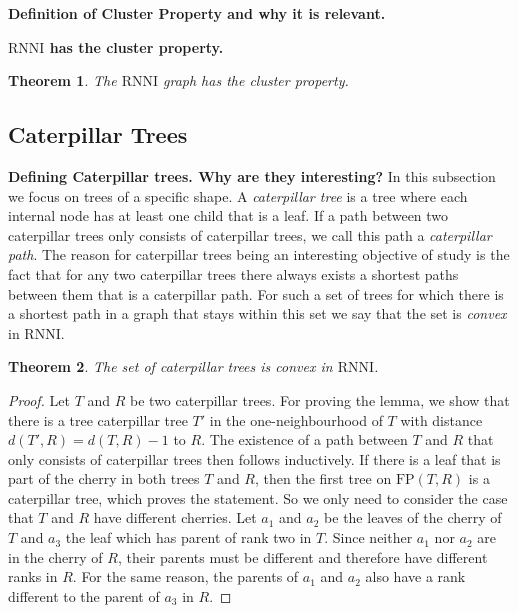 \documentclass[11pt]{amsart}
\newtheorem{theorem}{Theorem}
\newcommand{\rnni}{\mathrm{RNNI}}
\newcommand{\fp}{\mathrm{FP}}
\newcommand{\summary}[1]{\textbf{#1}} %
\begin{document}
\summary{Definition of Cluster Property and why it is relevant.}

\summary{$\rnni$ has the cluster property.}
\begin{theorem}
	The $\rnni$ graph has the cluster property.
\end{theorem}

\subsection{Caterpillar Trees}

\summary{Defining Caterpillar trees. Why are they interesting?}
In this subsection we focus on trees of a specific shape.
A \emph{caterpillar tree} is a tree where each internal node has at least one child that is a leaf.
If a path between two caterpillar trees only consists of caterpillar trees, we call this path a \emph{caterpillar path}.
The reason for caterpillar trees being an interesting objective of study is the fact that for any two caterpillar trees there always exists a shortest paths between them that is a caterpillar path.
For such a set of trees for which there is a shortest path in a graph that stays within this set we say that the set is \emph{convex} in $\rnni$.

\begin{theorem}
	The set of caterpillar trees is convex in $\rnni$.
	\label{thm:caterpillar_convex_rnni}
\end{theorem}

\begin{proof}
	Let $T$ and $R$ be two caterpillar trees.
	For proving the lemma, we show that there is a tree caterpillar tree $T'$ in the one-neighbourhood of $T$ with distance $d(T',R) = d(T,R) - 1$ to $R$.
	The existence of a path between $T$ and $R$ that only consists of caterpillar trees then follows inductively.
	If there is a leaf that is part of the cherry in both trees $T$ and $R$, then the first tree on $\fp(T,R)$ is a caterpillar tree, which proves the statement.
	So we only need to consider the case that $T$ and $R$ have different cherries.
	Let $a_1$ and $a_2$ be the leaves of the cherry of $T$ and $a_3$ the leaf which has parent of rank two in $T$.
	Since neither $a_1$ nor $a_2$ are in the cherry of $R$, their parents must be different and therefore have different ranks in $R$.
	For the same reason, the parents of $a_1$ and $a_2$ also have a rank different to the parent of $a_3$ in $R$.
\end{proof}
\end{document}

